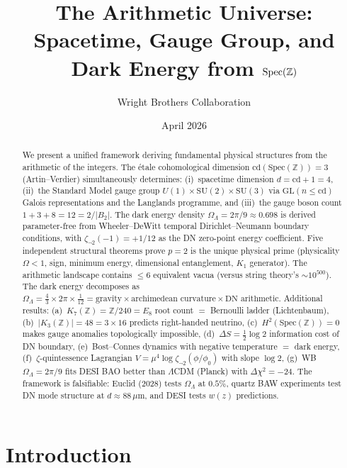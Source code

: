 \documentclass[12pt,a4paper]{article}
\title{\textbf{The Arithmetic Universe:\\
Spacetime, Gauge Group, and Dark Energy from $\Spec(\Z)$}}
\author{Wright Brothers Collaboration}
\date{April 2026}
\theoremstyle{definition}
\newcommand{\Spec}{\mathrm{Spec}}
\newcommand{\cd}{\mathrm{cd}}
\newcommand{\GL}{\mathrm{GL}}
\newcommand{\SU}{\mathrm{SU}}
\newcommand{\Z}{\mathbb{Z}}
\newcommand{\OmL}{\Omega_\Lambda}
\newcommand{\zetanot}{\zeta_{\neg 2}}
\begin{document}
\maketitle

\begin{abstract}
We present a unified framework deriving fundamental physical structures from the arithmetic of the integers.
The \'etale cohomological dimension $\cd(\Spec(\Z))=3$ (Artin--Verdier) simultaneously determines:
(i)~spacetime dimension $d=\cd+1=4$,
(ii)~the Standard Model gauge group $U(1)\times\SU(2)\times\SU(3)$
via $\GL(n\le\cd)$ Galois representations and the Langlands programme, and
(iii)~the gauge boson count $1+3+8=12=2/|B_2|$.
The dark energy density $\OmL=2\pi/9\approx0.698$ is derived parameter-free from
Wheeler--DeWitt temporal Dirichlet--Neumann boundary conditions,
with $\zetanot(-1)=+1/12$ as the DN zero-point energy coefficient.
Five independent structural theorems prove $p=2$ is the unique physical prime
(physicality $\Omega<1$, sign, minimum energy, dimensional entanglement, $K_1$ generator).
The arithmetic landscape contains $\le 6$ equivalent vacua (versus string theory's $\sim\!10^{500}$).
The dark energy decomposes as
$\OmL=\tfrac{4}{3}\times 2\pi\times\tfrac{1}{12}
=\text{gravity}\times\text{archimedean curvature}\times\text{DN arithmetic}$.
Additional results:
(a)~$K_7(\Z)=\Z/240=E_8$ root count $=$ Bernoulli ladder (Lichtenbaum),
(b)~$|K_3(\Z)|=48=3\times 16$ predicts right-handed neutrino,
(c)~$H^2(\Spec(\Z))=0$ makes gauge anomalies topologically impossible,
(d)~$\Delta S=\tfrac{1}{2}\log 2$ information cost of DN boundary,
(e)~Bost--Connes dynamics with negative temperature $=$ dark energy,
(f)~$\zeta$-quintessence Lagrangian $V=\mu^4\log\zetanot(\phi/\phi_0)$ with slope $\log 2$,
(g)~WB $\OmL=2\pi/9$ fits DESI BAO better than $\Lambda$CDM (Planck) with $\Delta\chi^2=-24$.
The framework is falsifiable:
Euclid (2028) tests $\OmL$ at $0.5\%$,
quartz BAW experiments test DN mode structure at $d\approx 88\,\mu$m,
and DESI tests $w(z)$ predictions.
\end{abstract}

\tableofcontents
\newpage

\section{Introduction}\label{sec:intro}
\end{document}
